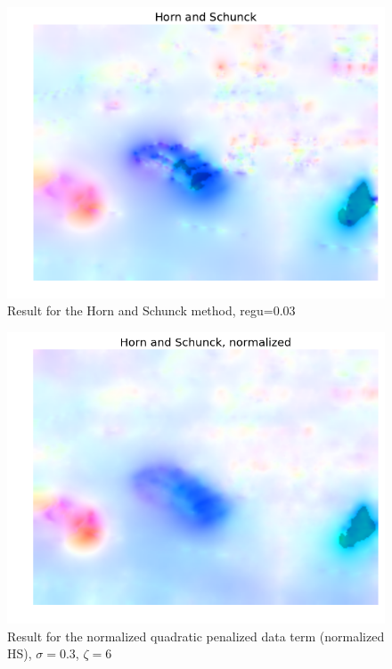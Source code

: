 \documentclass[10pt,a4paper]{article}
\begin{document}
\begin{figure}
    \centering
    \includegraphics[scale=0.7]{Thesis/Figures/HS}
    \caption{Result for the Horn and Schunck method, regu=0.03}
    \label{HS}
\end{figure}

\begin{figure}
    \centering
    \includegraphics[scale=0.7]{Thesis/Figures/HS_normalized}
    \caption{Result for the normalized quadratic penalized data term (normalized HS), $\sigma=0.3$, $\zeta = 6$}
    \label{HS_normalized}
\end{figure}
\end{document}
